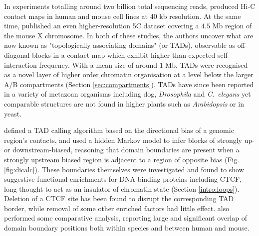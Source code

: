 \documentclass[a4paper,11pt,oneside]{book}
\begin{document}
In experiments totalling around two billion total sequencing reads, \citet{Dixon2012} produced Hi-C contact maps in human and mouse cell lines at 40 kb resolution. At the same time, \citet{Nora2012} published an even higher-resolution 5C dataset covering a $4.5$ Mb region of the mouse X chromosome. In both of these studies, the authors uncover what are now known as "topologically associating domains" (or TADs), observable as off-diagonal blocks in a contact map which exhibit higher-than-expected self-interaction frequency. With a mean size of around 1 Mb, TADs were recognised as a novel layer of higher order chromatin organisation at a level below the larger A/B compartments (Section \ref{sec:compartments}). TADs have since been reported in a variety of metazoan organisms including dog,\cite{VietriRudan2015} \emph{Drosophila}\cite{Sexton2012, Hou2012} and \emph{C.~elegans}\cite{Crane2015} yet comparable structures are not found in higher plants such as \emph{Arabidopsis}\cite{Feng2014, Wang2015} or in yeast.\cite{Duan2010, Gong2015}

\citet{Dixon2012} defined a TAD calling algorithm based on the directional bias of a genomic region's contacts, and used a hidden Markov model to infer blocks of strongly up- or downstream-biased, reasoning that domain boundaries are present when a strongly upstream biased region is adjacent to a region of opposite bias (Fig. \ref{fig:dicalc}). These boundaries themselves were investigated and found to show suggestive functional enrichments for DNA binding proteins including CTCF, long thought to act as an insulator of chromatin state (Section \ref{intro:loops}). Deletion of a  CTCF site has been found to disrupt the corresponding TAD border, while removal of some other enriched factors had little effect.\cite{Nora2012, Zuin2013, Narendra2015}
\citet{Dixon2012} also performed some comparative analysis, reporting large and significant overlap of domain boundary positions both within species and between human and mouse.
\end{document}
